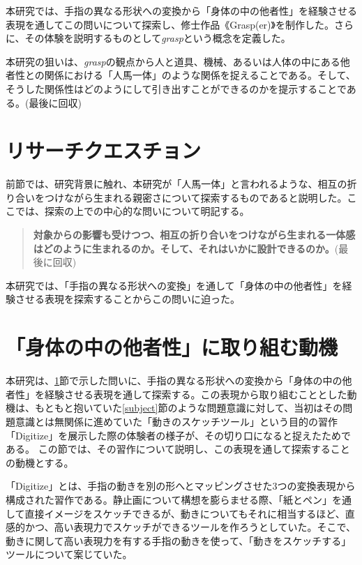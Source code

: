 本研究では、手指の異なる形状への変換から「身体の中の他者性」を経験させる表現を通してこの問いについて探索し、修士作品《Grasp(er)》を制作した。さらに、その体験を説明するものとして\textit{grasp}という概念を定義した。

本研究の狙いは、\textit{grasp}の観点から人と道具、機械、あるいは人体の中にある他者性との関係における「人馬一体」のような関係を捉えることである。そして、そうした関係性はどのようにして引き出すことができるのかを提示することである。(最後に回収)

\section{リサーチクエスチョン}
\label{research_question}
前節では、研究背景に触れ、本研究が「人馬一体」と言われるような、相互の折り合いをつけながら生まれる親密さについて探索するものであると説明した。ここでは、探索の上での中心的な問いについて明記する。

\begin{quote}
\textbf{対象からの影響も受けつつ、相互の折り合いをつけながら生まれる一体感はどのように生まれるのか。そして、それはいかに設計できるのか。}(最後に回収)
\end{quote}

本研究では、「手指の異なる形状への変換」を通して「身体の中の他者性」を経験させる表現を探索することからこの問いに迫った。

\section{「身体の中の他者性」に取り組む動機}
\label{prototyping_concept_making}
本研究は、\ref{research_question}節で示した問いに、手指の異なる形状への変換から「身体の中の他者性」を経験させる表現を通して探索する。この表現から取り組むこととした動機は、もともと抱いていた\ref{subject}節のような問題意識に対して、当初はその問題意識とは無関係に進めていた「動きのスケッチツール」という目的の習作「Digitize」を展示した際の体験者の様子が、その切り口になると捉えたためである。
この節では、その習作について説明し、この表現を通して探索することの動機とする。

「Digitize」とは、手指の動きを別の形へとマッピングさせた3つの変換表現から構成された習作である。静止画について構想を膨らませる際、「紙とペン」を通して直接イメージをスケッチできるが、動きについてもそれに相当するほど、直感的かつ、高い表現力でスケッチができるツールを作ろうとしていた。そこで、動きに関して高い表現力を有する手指の動きを使って、「動きをスケッチする」ツールについて案じていた。


